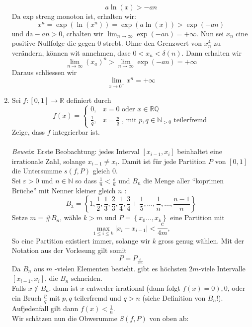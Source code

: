 \documentclass[a4paper,8pt]{extarticle}
\begin{document}
\begin{enumerate}
$$
a \ln (x)>-a n
$$
Da exp streng monoton ist, erhalten wir:
$$
x^{n}=\exp \left(\ln \left(x^{n}\right)\right)=\exp (a \ln (x))>\exp (-a n)
$$
und $\mathrm{da}-a n>0$, crhalten wir $\lim _{n \rightarrow \infty} \exp (-a n)=+\infty .$ Nun sei $x_{n}$ cine
positive Nullfolge die gegen 0 strebt. Ohne den Grenzwert von $x_{n}^{4}$ zu verändern, können wit annehmen, dase $0<x_{n}<\delta(n)$. Dann erhalten wir
$$
\lim _{n \rightarrow \infty}\left(x_{a}\right)^{n}>\lim _{n \rightarrow \infty} \exp (-a n)=+\infty
$$
Daraus schliessen wir
$$
\lim _{x \rightarrow 0^{+}} x^{n}=+\infty
$$
\item Sei $f:[0,1] \rightarrow \mathbb{R}$ definiert durch
$$
f(x)= \begin{cases}0, & x=0 \text { oder } x \in \mathbb{R} \mathbb{Q} \\ \frac{1}{q}, & x=\frac{p}{q} \text { , mit } p, q \in \mathbb{N}_{>0} \text{ teilerfremd} \end{cases}
$$
Zeige, dass $f$ integrierbar ist. \\ \\
\textit{Beweis}: Erste Beobachtung: jedes Interval $[x_{i-1}, x_i]$ beinhaltet eine irrationale Zahl, solange $x_{i-1} \neq x_i$. Damit ist für jede Partition $P$ von $[0, 1]$ die Untersumme $s(f, P)$ gleich $0$. \\
Sei $\varepsilon>0$ und $n \in \mathbb{N}$ so dass $\frac{1}{n}<\frac{\varepsilon}{n}$ und $B_{n}$ die Menge aller ``koprimen Brüche'' mit Nenner kleiner gleich $n$ :
$$
B_{\mathrm{a}}=\left\{1, \frac{1}{2}, \frac{1}{3}, \frac{2}{3}, \frac{1}{4}, \frac{3}{4}+\frac{1}{5}, \ldots, \frac{1}{n}, \ldots, \frac{n-1}{n}\right\}
$$
Setze $m=\#B_{n}$, wähle $k>m$ und $P=\left\{x_{0} \ldots, x_k\right\}$ eine Partition mit
$$
\max _{1 \leq i \leq k}\left|x_{i}-x_{i-1}\right|<\frac{e}{4 m},
$$
So eine Partition existiert immer, solange wir $k$ gross genug wählen. Mit der Notation aus der Vorlesung gilt somit
$$P=P_{\frac{\varepsilon}{4m}}$$
Da $B_{n}$ aus $m$ -vielen Elementen besteht. gibt es höchsten $2 m$-viele Intervalle $\left[x_{i-1}, x_{i}\right]$, die $B_{n}$ schneiden. \\
Falls $x \notin B_{a}$. dann ist $x$ entweder irrational (dann folgt $\left.f(x)=0\right), 0$, oder ein Bruch $\frac{p}{q}$ mit $p, q$ teilerfremd und $q>n$ (siehe Definition von $B_{n}$!). Aufjedenfall gilt dann $f(x)<\frac{1}{n}$. \\ 
Wir schätzen nun die Obwerumme $S(f, P)$ von oben ab:


\end{enumerate}
\end{document}
